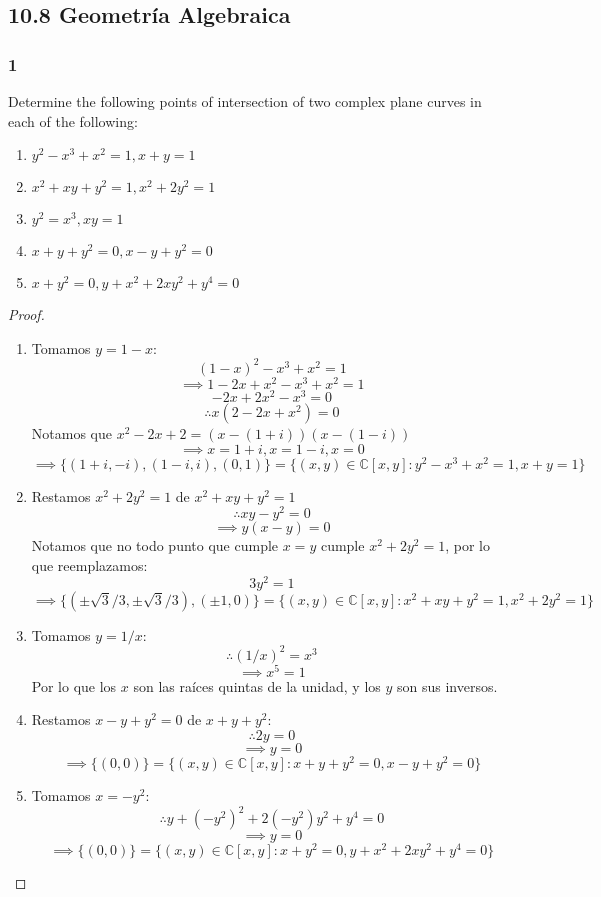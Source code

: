 \documentclass[11pt]{article}
\newcommand{\set}[1]{\mathbb{#1}}
\theoremstyle{definition}
\begin{document}
        \subsection{10.8 Geometría Algebraica}
        \subsubsection{1}
        Determine the following points of intersection of two complex plane curves in each of the following:
        \begin{enumerate}[label=\textbf{(\alph*)}]
            \item $y^2-x^3+x^2=1, x+y=1$

            \item $x^2+xy+y^2=1, x^2+2y^2=1$

            \item $y^2=x^3,xy=1$

            \item $x+y+y^2=0,x-y+y^2=0$

            \item $x+y^2=0,y+x^2+2xy^2+y^4=0$
        \end{enumerate}
        \begin{proof}    
            \begin{enumerate}[label=\textbf{(\alph*)}]
                \item Tomamos $y=1-x$:
                \[(1-x)^2-x^3+x^2=1\]
                \[\implies 1-2x+x^2-x^3+x^2=1\]
                \[-2x+2x^2-x^3=0\]
                \[\therefore x(2-2x+x^2)=0\]
                Notamos que $x^2-2x+2=(x-(1+i))(x-(1-i))$
                \[\implies x=1+i,x=1-i,x=0\]
                \[\implies \{(1+i,-i),(1-i,i),(0,1)\}=\{(x,y)\in\set{C}[x,y]:y^2-x^3+x^2=1,x+y=1\}\]

                \item Restamos $x^2+2y^2=1$ de $x^2+xy+y^2=1$
                \[\therefore xy-y^2=0\]
                \[\implies y(x-y)=0\]
                Notamos que no todo punto que cumple $x=y$ cumple $x^2+2y^2=1$, por lo que reemplazamos:
                \[3y^2=1\]
                \[\implies \{(\pm\sqrt{3}/3,\pm\sqrt{3}/3),(\pm 1,0)\}=\{(x,y)\in\set{C}[x,y]:x^2+xy+y^2=1, x^2+2y^2=1\}\]

                \item Tomamos $y=1/x$:
                \[\therefore (1/x)^2=x^3\]
                \[\implies x^5=1\]
                Por lo que los $x$ son las raíces quintas de la unidad, y los $y$ son sus inversos.

                \item Restamos $x-y+y^2=0$ de $x+y+y^2$:
                \[\therefore 2y=0\]
                \[\implies y=0\]
                \[\implies \{(0,0)\}=\{(x,y)\in\set{C}[x,y]:x+y+y^2=0,x-y+y^2=0\}\]

                \item Tomamos $x=-y^2$:
                \[\therefore y+(-y^2)^2+2(-y^2)y^2+y^4=0\]
                \[\implies y=0\]
                \[\implies \{(0,0)\}=\{(x,y)\in\set{C}[x,y]:x+y^2=0,y+x^2+2xy^2+y^4=0\}\]
            \end{enumerate}
        \end{proof}
\end{document}

